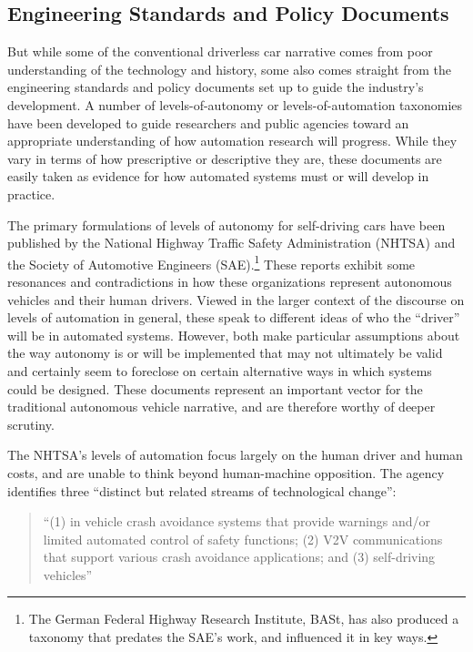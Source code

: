 \subsection{Engineering Standards and Policy Documents}

But while some of the conventional driverless car narrative comes from
poor understanding of the technology and history, some also comes
straight from the engineering standards and policy documents set up to
guide the industry's development. A number of levels-of-autonomy or
levels-of-automation taxonomies have been developed to guide
researchers and public agencies toward an appropriate understanding of
how automation research will progress. While they vary in terms of how
prescriptive or descriptive they are, these documents are easily taken
as evidence for how automated systems must or will develop in
practice.

The primary formulations of levels of autonomy for self-driving cars
have been published by the National Highway Traffic Safety
Administration (NHTSA) and the Society of Automotive Engineers
(SAE).\footnote{The German Federal Highway Research Institute, BASt,
 has also produced a taxonomy that predates the SAE's work, and
 influenced it in key ways.}
These reports exhibit some resonances and contradictions in how these
organizations represent autonomous vehicles and their human drivers.
Viewed in the larger context of the discourse on levels of automation
in general, these speak to different ideas of who the “driver” will be
in automated systems. However, both make particular assumptions about
the way autonomy is or will be implemented that may not ultimately be
valid and certainly seem to foreclose on certain alternative ways in
which systems could be designed. These documents represent an important
vector for the traditional autonomous vehicle narrative, and are
therefore worthy of deeper scrutiny.

The NHTSA's levels of automation focus largely on the human driver and
human costs, and are unable to think beyond human-machine opposition.
The agency identifies three ``distinct but related streams of
technological change'': 

\begin{quote}
``(1) in vehicle crash avoidance systems that provide warnings and/or
limited automated control of safety functions; (2) V2V communications
that support various crash avoidance applications; and (3)
self-driving vehicles''\cite{???}
\end{quote}

